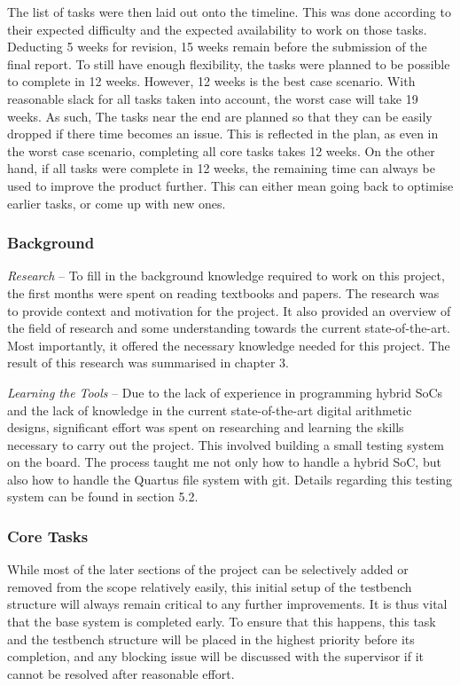 The list of tasks were then laid out onto the timeline.
This was done according to their expected difficulty and the expected
availability to work on those tasks.
Deducting 5 weeks for revision, 15 weeks remain before the submission of the
final report.
To still have enough flexibility, the tasks were planned to be possible to
complete in 12 weeks.
However, 12 weeks is the best case scenario.
With reasonable slack for all tasks taken into account, the worst case will
take 19 weeks.
As such, The tasks near the end are planned so that they can be easily dropped
if there time becomes an issue.
This is reflected in the plan, as even in the worst case scenario, completing
all core tasks takes 12 weeks.
On the other hand, if all tasks were complete in 12 weeks, the remaining
time can always be used to improve the product further.
This can either mean going back to optimise earlier tasks,
or come up with new ones.

\subsubsection{Background}

\textit{Research} --
To fill in the background knowledge required to work on this project, the first
months were spent on reading textbooks and papers.
The research was to provide context and motivation for the project.
It also provided an overview of the field of research and some understanding
towards the current state-of-the-art.
Most importantly, it offered the necessary knowledge needed for this project.
The result of this research was summarised in chapter 3.

\textit{Learning the Tools} --
Due to the lack of experience in programming hybrid SoCs and the lack of
knowledge in the current state-of-the-art digital arithmetic designs,
significant effort was spent on researching and learning the skills
necessary to carry out the project.
This involved building a small testing system on the board.
The process taught me not only how to handle a hybrid SoC, but also how to
handle the Quartus file system with git.
Details regarding this testing system can be found in section 5.2.

\subsubsection{Core Tasks}

While most of the later sections of the project can be selectively added or
removed from the scope relatively easily, this initial setup of the testbench
structure will always remain critical to any further improvements.
It is thus vital that the base system is completed early.
To ensure that this happens, this task and the testbench structure will be
placed in the highest priority before its completion, and any blocking issue
will be discussed with the supervisor if it cannot be resolved after reasonable
effort.

